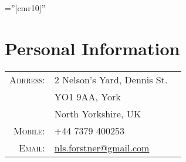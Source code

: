 \documentclass[a4paper,10pt]{article}
\begin{document}
\pagestyle{empty} %

\font\fb=''[cmr10]'' %

\par{
    \bigskip\par
}


\section{Personal Information}

\begin{tabular}{rll}
    \textsc{Adrress:}       & 2 Nelson's Yard, Dennis St. \\
                            & YO1 9AA, York \\
                            & North Yorkshire, UK \\
    \textsc{Mobile:}        & +44 7379 400253\\
    \textsc{Email:}         & \href{mailto:nls.forstner@gmail.com}{nls.forstner@gmail.com} \\

\end{tabular}
\end{document}
